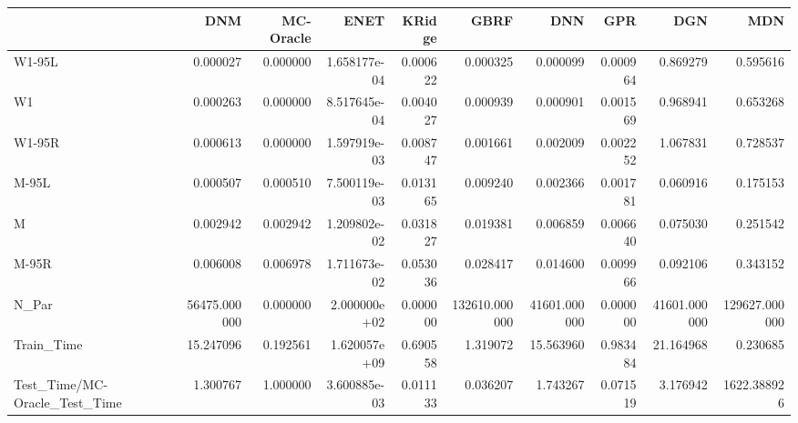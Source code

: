 \begin{tabular}{lrrrrrrrrr}
\toprule
{} &           DNM &  MC-Oracle &          ENET &    KRidge &           GBRF &           DNN &       GPR &           DGN &            MDN \\
\midrule
W1-95L                        &      0.000027 &   0.000000 &  1.658177e-04 &  0.000622 &       0.000325 &      0.000099 &  0.000964 &      0.869279 &       0.595616 \\
W1                            &      0.000263 &   0.000000 &  8.517645e-04 &  0.004027 &       0.000939 &      0.000901 &  0.001569 &      0.968941 &       0.653268 \\
W1-95R                        &      0.000613 &   0.000000 &  1.597919e-03 &  0.008747 &       0.001661 &      0.002009 &  0.002252 &      1.067831 &       0.728537 \\
M-95L                         &      0.000507 &   0.000510 &  7.500119e-03 &  0.013165 &       0.009240 &      0.002366 &  0.001781 &      0.060916 &       0.175153 \\
M                             &      0.002942 &   0.002942 &  1.209802e-02 &  0.031827 &       0.019381 &      0.006859 &  0.006640 &      0.075030 &       0.251542 \\
M-95R                         &      0.006008 &   0.006978 &  1.711673e-02 &  0.053036 &       0.028417 &      0.014600 &  0.009966 &      0.092106 &       0.343152 \\
N\_Par                         &  56475.000000 &   0.000000 &  2.000000e+02 &  0.000000 &  132610.000000 &  41601.000000 &  0.000000 &  41601.000000 &  129627.000000 \\
Train\_Time                    &     15.247096 &   0.192561 &  1.620057e+09 &  0.690558 &       1.319072 &     15.563960 &  0.983484 &     21.164968 &       0.230685 \\
Test\_Time/MC-Oracle\_Test\_Time &      1.300767 &   1.000000 &  3.600885e-03 &  0.011133 &       0.036207 &      1.743267 &  0.071519 &      3.176942 &    1622.388926 \\
\bottomrule
\end{tabular}
